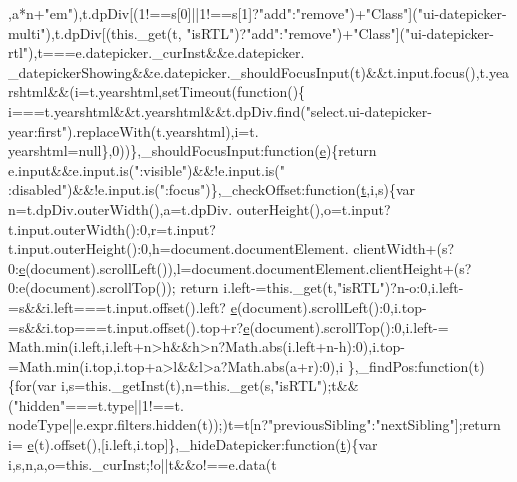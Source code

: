 \begin{DoxyCode}
      ,a*n+\textcolor{stringliteral}{"em"}),t.dpDiv[(1!==s[0]||1!==s[1]?\textcolor{stringliteral}{"add"}:\textcolor{stringliteral}{"remove"})+\textcolor{stringliteral}{"Class"}](\textcolor{stringliteral}{"ui-datepicker-multi"}),t.dpDiv[(this.\_get(t,\textcolor{stringliteral}{
      "isRTL"})?\textcolor{stringliteral}{"add"}:\textcolor{stringliteral}{"remove"})+\textcolor{stringliteral}{"Class"}](\textcolor{stringliteral}{"ui-datepicker-rtl"}),t===e.datepicker.\_curInst&&e.datepicker.
      \_datepickerShowing&&e.datepicker.\_shouldFocusInput(t)&&t.input.focus(),t.yearshtml&&(i=t.yearshtml,setTimeout(\textcolor{keyword}{function}()\{
      i===t.yearshtml&&t.yearshtml&&t.dpDiv.find(\textcolor{stringliteral}{"select.ui-datepicker-year:first"}).replaceWith(t.yearshtml),i=t.
      yearshtml=null\},0))\},\_shouldFocusInput:\textcolor{keyword}{function}(\hyperlink{jquery-ui_8min_8js_a2c038346d47955cbe2cb91e338edd7e1}{e})\{\textcolor{keywordflow}{return} e.input&&e.input.is(\textcolor{stringliteral}{":visible"})&&!e.input.is(\textcolor{stringliteral}{"
      :disabled"})&&!e.input.is(\textcolor{stringliteral}{":focus"})\},\_checkOffset:\textcolor{keyword}{function}(\hyperlink{jquery-2_80_83_8min_8js_aaccc9105df5383111407fd5b41255e23}{t},i,s)\{var n=t.dpDiv.outerWidth(),a=t.dpDiv.
      outerHeight(),o=t.input?t.input.outerWidth():0,r=t.input?t.input.outerHeight():0,h=document.documentElement.
      clientWidth+(s?0:\hyperlink{jquery-ui_8min_8js_a2c038346d47955cbe2cb91e338edd7e1}{e}(document).scrollLeft()),l=document.documentElement.clientHeight+(s?0:e(document).scrollTop());\textcolor{keywordflow}{
      return} i.left-=this.\_get(t,\textcolor{stringliteral}{"isRTL"})?n-o:0,i.left-=s&&i.left===t.input.offset().left?
      \hyperlink{jquery-ui_8min_8js_a2c038346d47955cbe2cb91e338edd7e1}{e}(document).scrollLeft():0,i.top-=s&&i.top===t.input.offset().top+r?\hyperlink{jquery-ui_8min_8js_a2c038346d47955cbe2cb91e338edd7e1}{e}(document).scrollTop():0,i.left-=
      Math.min(i.left,i.left+n>h&&h>n?Math.abs(i.left+n-h):0),i.top-=Math.min(i.top,i.top+a>l&&l>a?Math.abs(a+r):0),i
      \},\_findPos:\textcolor{keyword}{function}(t)\{\textcolor{keywordflow}{for}(var i,s=this.\_getInst(t),n=this.\_get(s,\textcolor{stringliteral}{"isRTL"});t&&(\textcolor{stringliteral}{"hidden"}===t.type||1!==t.
      nodeType||e.expr.filters.hidden(t));)t=t[n?\textcolor{stringliteral}{"previousSibling"}:\textcolor{stringliteral}{"nextSibling"}];\textcolor{keywordflow}{return} i=
      \hyperlink{jquery-ui_8min_8js_a2c038346d47955cbe2cb91e338edd7e1}{e}(t).offset(),[i.left,i.top]\},\_hideDatepicker:\textcolor{keyword}{function}(\hyperlink{jquery-2_80_83_8min_8js_aaccc9105df5383111407fd5b41255e23}{t})\{var i,s,n,a,o=this.\_curInst;!o||t&&o!==e.data(t

\end{DoxyCode}
